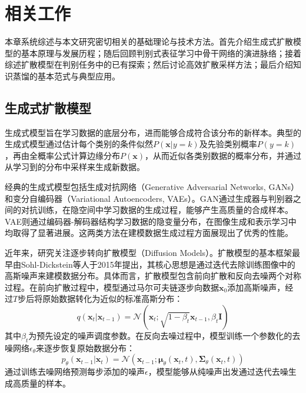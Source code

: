 ﻿\setlength{\baselineskip}{20pt}
\chapter{相关工作}
\label{cha:chap2}

本章系统综述与本文研究密切相关的基础理论与技术方法。首先介绍生成式扩散模型的基本原理与发展历程；随后回顾判别式表征学习中骨干网络的演进脉络；接着综述扩散模型在判别任务中的已有探索；然后讨论高效扩散采样方法；最后介绍知识蒸馏的基本范式与典型应用。

\section{生成式扩散模型}

生成式模型旨在学习数据的底层分布，进而能够合成符合该分布的新样本。典型的生成式模型通过估计每个类别的条件似然$P(\mathbf{x}|y=k)$及先验类别概率$P(y=k)$，再由全概率公式计算边缘分布$P(\mathbf{x})$，从而近似各类别数据的概率分布，并通过从学习到的分布中采样来生成新数据。

经典的生成式模型包括生成对抗网络（Generative Adversarial Networks, GANs）\cite{goodfellow2014generative,karras2019style,mirza2014conditional}和变分自编码器（Variational Autoencoders, VAEs）\cite{kingma2013auto,van2017neural,xu2022socialvae,zhao2017learning}。GAN通过生成器与判别器之间的对抗训练，在隐空间中学习数据的生成过程，能够产生高质量的合成样本。VAE则通过编码器-解码器结构学习数据的隐变量分布，在图像生成和表示学习中均取得了显著进展。这两类方法在建模数据生成过程方面展现出了优秀的性能。

近年来，研究关注逐步转向扩散模型（Diffusion Models）。扩散模型的基本框架最早由Sohl-Dickstein等人\cite{sohl2015deep}于2015年提出，其核心思想是通过迭代去除训练图像中的高斯噪声来建模数据分布。具体而言，扩散模型包含前向扩散和反向去噪两个对称过程。在前向扩散过程中，模型通过马尔可夫链逐步向数据$\mathbf{x}_0$添加高斯噪声，经过$T$步后将原始数据转化为近似的标准高斯分布：
\begin{equation}
q(\mathbf{x}_t|\mathbf{x}_{t-1}) = \mathcal{N}(\mathbf{x}_t; \sqrt{1-\beta_t}\mathbf{x}_{t-1}, \beta_t\mathbf{I})
\end{equation}
其中$\beta_t$为预先设定的噪声调度参数。在反向去噪过程中，模型训练一个参数化的去噪网络$\epsilon_\theta$来逐步恢复原始数据分布：
\begin{equation}
p_\theta(\mathbf{x}_{t-1}|\mathbf{x}_t) = \mathcal{N}(\mathbf{x}_{t-1}; \boldsymbol{\mu}_\theta(\mathbf{x}_t, t), \boldsymbol{\Sigma}_\theta(\mathbf{x}_t, t))
\end{equation}
通过训练去噪网络预测每步添加的噪声$\epsilon$，模型能够从纯噪声出发通过迭代去噪生成高质量的样本。

